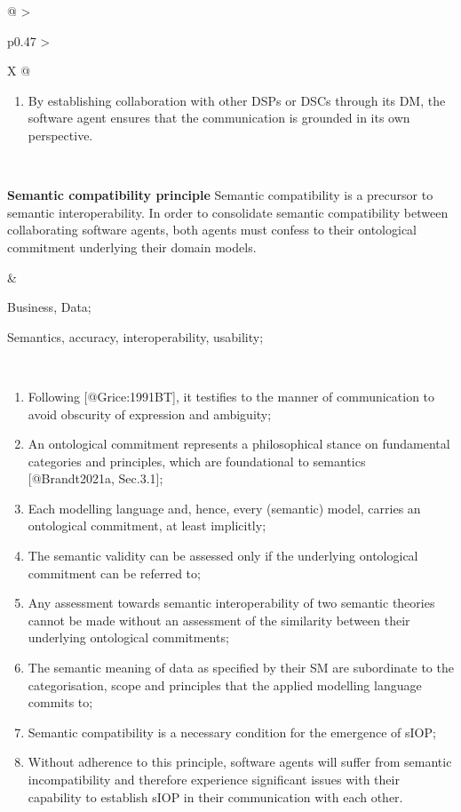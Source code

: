 \begin{xltabular}[l]{\linewidth}{@{} >{\small\raggedright\arraybackslash}p{0.47\linewidth} >{\small\raggedright\arraybackslash}X @{}}
\begin{enumerate}[left=10pt, nosep]
  \item By establishing collaboration with other DSPs or DSCs through its DM, the software agent ensures that the communication is grounded in its own perspective.
\end{enumerate} \\
%
%
%
\begin{mmdp}\label{dp:scp}{\bfseries Semantic compatibility principle}
\quad Semantic compatibility is a precursor to semantic interoperability. In order to consolidate semantic compatibility between collaborating software agents, both agents must confess to their ontological commitment underlying their domain models.\end{mmdp} 
&
\begin{description}[labelwidth=3.7cm,leftmargin=3.7cm+1ex,nosep,topsep=2ex,labelsep=1ex,font=\bfseries]
\item[Type of information:] Business, Data;
\item[Quality attributes:] Semantics, accuracy, interoperability, usability;
\end{description} \\
\begin{enumerate}[left=6pt, nosep]
  \item Following [@Grice:1991BT], it testifies to the manner of communication to avoid obscurity of expression and ambiguity;
  \item An ontological commitment represents a philosophical stance on fundamental categories and principles, which are foundational to semantics [@Brandt2021a, Sec.3.1];
  \item Each modelling language and, hence, every (semantic) model, carries an ontological commitment, at least implicitly;
  \item The semantic validity can be assessed only if the underlying ontological commitment can be referred to;
  \item Any assessment towards semantic interoperability of two semantic theories cannot be made without an assessment of the similarity between their underlying ontological commitments;
  \item The semantic meaning of data as specified by their SM are subordinate to the categorisation, scope and principles that the applied modelling language commits to; 
  \item Semantic compatibility is a necessary condition for the emergence of sIOP; 
  \item Without adherence to this principle, software agents will suffer from semantic incompatibility and therefore experience significant issues with their capability to establish sIOP in their communication with each other.

\end{enumerate}
\end{xltabular}
